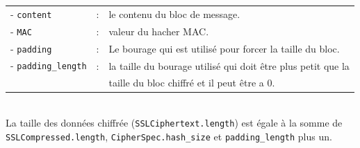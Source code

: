 \begin{tabular}{llm{10cm}}
- \texttt{content}          & : & le contenu du bloc de message. \\
- \texttt{MAC}              & : & valeur du hacher MAC.\\
- \texttt{padding}          & : & Le bourage qui est utilisé pour forcer la taille du bloc.\\
- \texttt{padding\_length}  & : & la taille du bourage utilisé qui doit être plus petit que la \\
                            &   & taille du bloc chiffré et il peut être a 0.\\
\end{tabular}
\\

La taille des données chiffrée (\texttt{SSLCiphertext.length}) est égale à la somme de \texttt{SSLCompressed.length}, \texttt{CipherSpec.hash\_size} et \texttt{padding\_length} plus un.


